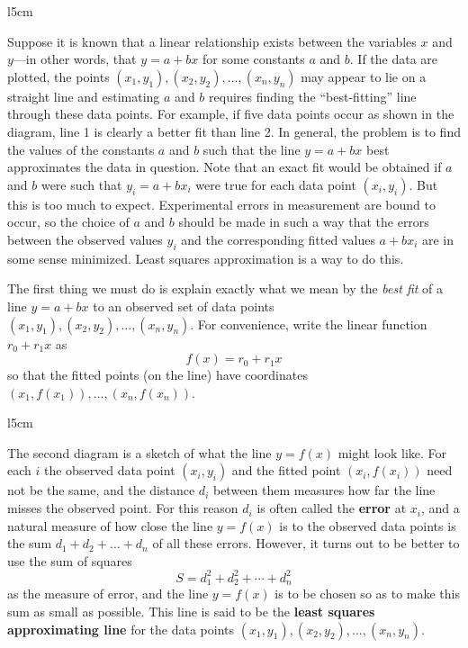 \begin{wrapfigure}{l}{5cm} 
\centering

\end{wrapfigure}

Suppose it is known that a linear relationship exists between the variables $x$ and $y$---in other words, that $y = a + bx$ for some constants $a$ and $b$. If the data are plotted, the points $(x_{1}, y_{1}), (x_{2}, y_{2}), \dots, (x_{n}, y_{n})$ may appear to lie on a straight line and estimating $a$ and $b$ requires finding the ``best-fitting'' line through these data points. For example, if five data points occur as shown in the diagram, line 1 is clearly a better fit than line 2. In general, the problem is to find the values of the constants $a$ and $b$ such that the line $y = a + bx$ best approximates the data in question. Note that an exact fit would be obtained if $a$ and $b$ were such that $y_{i} = a + bx_{i}$ were true for each data point $(x_{i}, y_{i})$. But this is too much to expect. Experimental errors in measurement are bound to occur, so the choice of $a$ and $b$ should be made in such a way that the errors between the observed values $y_{i}$ and the corresponding fitted values $a + bx_{i}$ are in some sense minimized. Least squares approximation is a way to do this.

The first thing we must do is explain exactly what we mean by the \textit{best fit} of a line $y = a + bx$ to an observed set of data points $(x_{1}, y_{1}), (x_{2}, y_{2}), \dots, (x_{n}, y_{n})$. For convenience, write the linear function $r_{0} + r_{1}x$ as
\begin{equation*}
f(x) = r_0 +r_1x
\end{equation*}
so that the fitted points (on the line) have coordinates $(x_{1}, f(x_{1})), \dots, (x_{n}, f(x_{n}))$.

\begin{wrapfigure}{l}{5cm} 
\centering

\end{wrapfigure}
 
The second diagram is a sketch of what the line $y = f(x)$ might look like. For each $i$ the observed data point $(x_{i}, y_{i})$ and the fitted point $(x_{i}, f(x_{i}))$ need not be the same, and the distance $d_{i}$ between them measures how far the line misses the observed point. For this reason $d_{i}$ is often called the \textbf{error} at $x_{i}$, and a natural measure of how close the line $y = f(x)$ is to the observed data points is the sum $d_{1} + d_{2} + \dots + d_{n}$ of all these errors. However, it turns out to be better to use the sum of squares
\begin{equation*}
S = d_1^2 + d_2^2 + \dotsb + d_n^2
\end{equation*}
as the measure of error, and the line $y = f(x)$ is to be chosen so as to make this sum as small as possible. This line is said to be the \textbf{least squares approximating line} for the data points $(x_{1}, y_{1}), (x_{2}, y_{2}), \dots, (x_{n}, y_{n})$.

